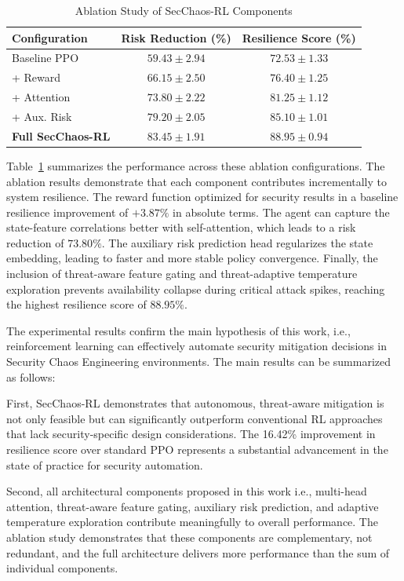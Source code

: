 \documentclass[pdflatex,sn-mathphys-num]{sn-jnl}%
\theoremstyle{thmstyleone}%
\theoremstyle{thmstyletwo}%
\theoremstyle{thmstylethree}%
\begin{document}
	\begin{table}[h]
		\centering
		\caption{Ablation Study of SecChaos-RL Components}
		\label{tab:ablation_results}
		\footnotesize
		\begin{tabular}{@{}lcc@{}}
			\toprule
			\textbf{Configuration} & \textbf{Risk Reduction (\%)} & \textbf{Resilience Score (\%)} \\
			\midrule
			Baseline PPO & $59.43 \pm 2.94$ & $72.53 \pm 1.33$ \\
			+ Reward & $66.15 \pm 2.50$ & $76.40 \pm 1.25$ \\
			+ Attention & $73.80 \pm 2.22$ & $81.25 \pm 1.12$ \\
			+ Aux. Risk & $79.20 \pm 2.05$ & $85.10 \pm 1.01$ \\
			\textbf{Full SecChaos-RL} & $\mathbf{83.45 \pm 1.91}$ & $\mathbf{88.95 \pm 0.94}$ \\
			\bottomrule
		\end{tabular}
	\end{table}
	
	Table~\ref{tab:ablation_results} summarizes the performance across these ablation configurations. The ablation results demonstrate that each component contributes incrementally to system resilience. The reward function optimized for security results in a baseline resilience improvement of $+3.87\%$ in absolute terms. The agent can capture the state-feature correlations better with self-attention, which leads to a risk reduction of $73.80\%$. The auxiliary risk prediction head regularizes the state embedding, leading to faster and more stable policy convergence. Finally, the inclusion of threat-aware feature gating and threat-adaptive temperature exploration prevents availability collapse during critical attack spikes, reaching the highest resilience score of $88.95\%$.
	
	The experimental results confirm the main hypothesis of this work, i.e., reinforcement learning can effectively automate security mitigation decisions in Security Chaos Engineering environments. The main results can be summarized as follows: 
	
	First, SecChaos-RL demonstrates that autonomous, threat-aware mitigation is not only feasible but can significantly outperform conventional RL approaches that lack security-specific design considerations. The 16.42\% improvement in resilience score over standard PPO represents a substantial advancement in the state of practice for security automation.
	
	Second, all architectural components proposed in this work i.e., multi-head attention, threat-aware feature gating, auxiliary risk prediction, and adaptive temperature exploration contribute meaningfully to overall performance. The ablation study demonstrates that these components are complementary, not redundant, and the full architecture delivers more performance than the sum of individual components.
	
\end{document}
